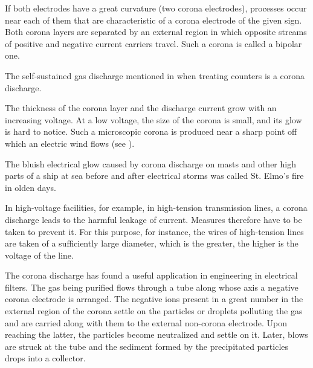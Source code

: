 If both electrodes have a great curvature (two corona electrodes), processes occur near each of them that are characteristic of a corona electrode of the given sign.
Both corona layers are separated by an external region in which opposite streams of positive and negative current carriers travel.
Such a corona is called a bipolar one.

The self-sustained gas discharge mentioned in  when treating counters is a corona discharge.

The thickness of the corona layer and the discharge current grow with an increasing voltage.
At a low voltage, the size of the corona is small, and its glow is hard to notice.
Such a microscopic corona is produced near a sharp point off which an electric wind flows (see
).

The bluish electrical glow caused by corona discharge on masts and other high parts of a ship at sea before and after electrical storms was called St. Elmo's fire in olden days.

In high-voltage facilities, for example, in high-tension transmission lines, a corona discharge leads to the harmful leakage of current.
Measures therefore have to be taken to prevent it.
For this purpose, for instance, the wires of high-tension lines are taken of a sufficiently large diameter, which is the greater, the higher is the voltage of the line.

The corona discharge has found a useful application in engineering in electrical filters.
The gas being purified flows through a tube along whose axis a negative corona electrode is arranged.
The negative ions present in a great number in the external region of the corona settle on the particles or droplets polluting the gas and are carried along with them to the external non-corona electrode.
Upon reaching the latter, the particles become neutralized and settle on it.
Later, blows are struck at the tube and the sediment formed by the precipitated particles drops into a collector.
